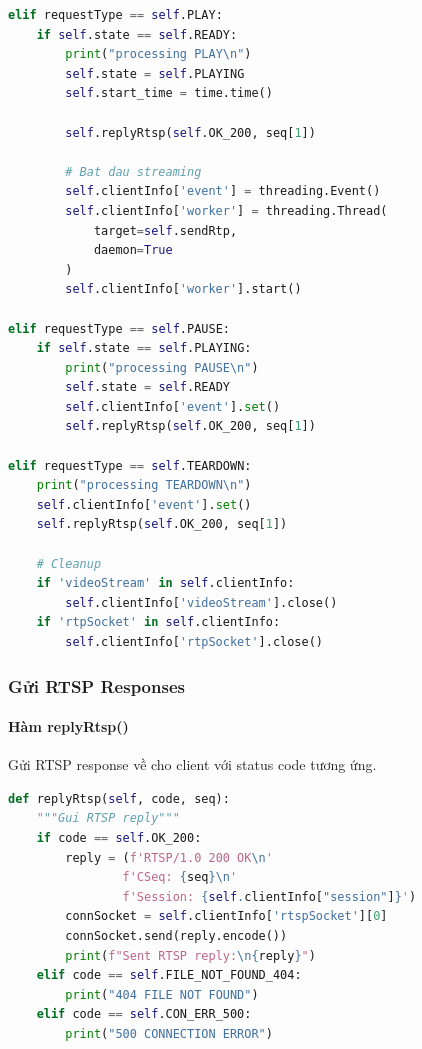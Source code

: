 \documentclass[a4paper,12pt]{article}
\begin{document}
\begin{lstlisting}[language=Python, caption={Process RTSP Request - PLAY/PAUSE/TEARDOWN}]
elif requestType == self.PLAY:
    if self.state == self.READY:
        print("processing PLAY\n")
        self.state = self.PLAYING
        self.start_time = time.time()

        self.replyRtsp(self.OK_200, seq[1])

        # Bat dau streaming
        self.clientInfo['event'] = threading.Event()
        self.clientInfo['worker'] = threading.Thread(
            target=self.sendRtp,
            daemon=True
        )
        self.clientInfo['worker'].start()

elif requestType == self.PAUSE:
    if self.state == self.PLAYING:
        print("processing PAUSE\n")
        self.state = self.READY
        self.clientInfo['event'].set()
        self.replyRtsp(self.OK_200, seq[1])

elif requestType == self.TEARDOWN:
    print("processing TEARDOWN\n")
    self.clientInfo['event'].set()
    self.replyRtsp(self.OK_200, seq[1])

    # Cleanup
    if 'videoStream' in self.clientInfo:
        self.clientInfo['videoStream'].close()
    if 'rtpSocket' in self.clientInfo:
        self.clientInfo['rtpSocket'].close()
\end{lstlisting}

\subsubsection{Gửi RTSP Responses}

\paragraph{Hàm replyRtsp()}
Gửi RTSP response về cho client với status code tương ứng.

\begin{lstlisting}[language=Python, caption={Reply RTSP}]
def replyRtsp(self, code, seq):
    """Gui RTSP reply"""
    if code == self.OK_200:
        reply = (f'RTSP/1.0 200 OK\n'
                f'CSeq: {seq}\n'
                f'Session: {self.clientInfo["session"]}')
        connSocket = self.clientInfo['rtspSocket'][0]
        connSocket.send(reply.encode())
        print(f"Sent RTSP reply:\n{reply}")
    elif code == self.FILE_NOT_FOUND_404:
        print("404 FILE NOT FOUND")
    elif code == self.CON_ERR_500:
        print("500 CONNECTION ERROR")
\end{lstlisting}
\end{document}
